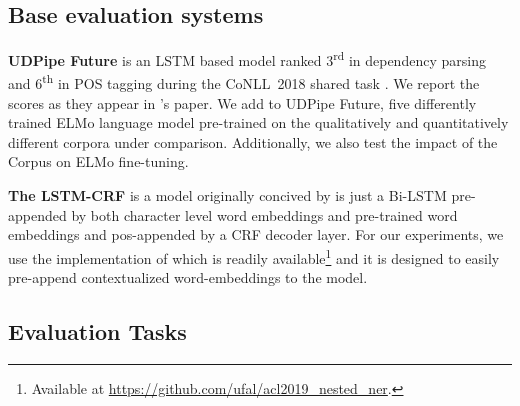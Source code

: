 




\subsection{Base evaluation systems}

\textbf{UDPipe Future} \citep{straka-2018-udpipe} is an LSTM based model ranked 3\textsuperscript{rd} in dependency parsing and 6\textsuperscript{th} in POS tagging during the CoNLL~2018 shared task \citep{seker-etal-2018-universal}. We report the scores as they appear in \citet{kondratyuk-straka-2019-75}'s paper.
We add to UDPipe Future, five differently trained ELMo language model pre-trained on the qualitatively and quantitatively different corpora under comparison. Additionally, we also test the impact of the \Cabernet Corpus on ELMo fine-tuning.

\textbf{The LSTM-CRF} is a model originally concived by \citet{lample-etal-2016-neural} is just a Bi-LSTM pre-appended by both character level word embeddings and pre-trained word embeddings and pos-appended by a CRF decoder layer. For our experiments, we use the implementation of \citep{strakova-etal-2019-neural} which is readily available\footnote{Available at \url{https://github.com/ufal/acl2019_nested_ner}.} and it is designed to easily pre-append contextualized word-embeddings to the model.

\subsection{Evaluation Tasks}\label{MethodEVAL}

